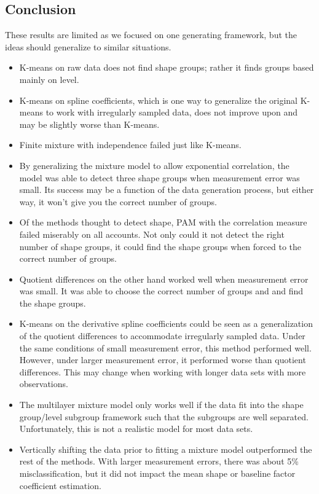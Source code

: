 \documentclass[12pt]{article}
\begin{document}
\subsection{Conclusion}
These results are limited as we focused on one generating framework, but the ideas should generalize to similar situations.
\begin{itemize}
\item K-means on raw data does not find shape groups; rather it finds groups based mainly on level.
\item K-means on spline coefficients, which is one way to generalize the original K-means to work with irregularly sampled data, does not improve upon and may be slightly worse than K-means.
\item Finite mixture with independence failed just like K-means.
\item By generalizing the mixture model to allow exponential correlation, the model was able to detect three shape groups when measurement error was small. Its success may be a function of the data generation process, but either way, it won't give you the correct number of groups.
\item Of the methods thought to detect shape, PAM with the correlation measure failed miserably on all accounts. Not only could it not detect the right number of shape groups, it could find the shape groups when forced to the correct number of groups. 
\item Quotient differences on the other hand worked well when measurement error was small. It was able to choose the correct number of groups and and find the shape groups.
\item K-means on the derivative spline coefficients could be seen as a generalization of the quotient differences to accommodate irregularly sampled data. Under the same conditions of small measurement error, this method performed well. However, under larger measurement error, it performed worse than quotient differences. This may change when working with longer data sets with more observations.
\item The multilayer mixture model only works well if the data fit into the shape group/level subgroup framework such that the subgroups are well separated. Unfortunately, this is not a realistic model for most data sets. 
\item Vertically shifting the data prior to fitting a mixture model outperformed the rest of the methods. With larger measurement errors, there was about 5\% misclassification, but it did not impact the mean shape or baseline factor coefficient estimation.
\end{itemize}
\end{document}
